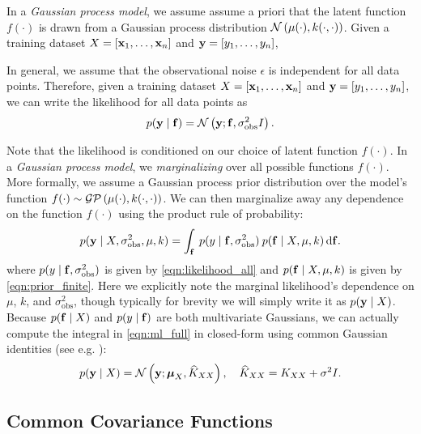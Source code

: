 In a \emph{Gaussian process model}, we assume assume a priori that the latent function $f(\cdot)$ is drawn from a Gaussian process distribution $\mathcal{N} \left( \mu(\cdot), k(\cdot, \cdot) \right)$.
Given a training dataset $X = [\mathbf{x}_1, \ldots, \mathbf{x}_n]$ and $\mathbf{y} = [y_1, \ldots, y_n]$,


In general, we assume that the observational noise $\epsilon$ is independent for all data points.
Therefore, given a training dataset $X = [\mathbf{x}_1, \ldots, \mathbf{x}_n]$ and $\mathbf{y} = [y_1, \ldots, y_n]$, we can write the likelihood for all data points as
%
\begin{equation}
  p(\mathbf{y} \mid \mathbf{f}) = \mathcal{N} \left(  \mathbf{y}; \mathbf{f}, \sigma^2_\text{obs} I \right).
  \label{eqn:likelihood_all}
\end{equation}

Note that the likelihood is conditioned on our choice of latent function $f(\cdot)$.
In a \emph{Gaussian process model}, we \emph{marginalizing} over all possible functions $f(\cdot)$.
More formally, we assume a Gaussian process prior distribution over the model's function $f(\cdot) \sim \mathcal{GP} \left( \mu(\cdot), k(\cdot, \cdot) \right)$.
We can then marginalize away any dependence on the function $f(\cdot)$ using the product rule of probability:
%
\begin{equation}
  p( \mathbf{y} \mid X, \sigma^2_\text{obs}, \mu, k ) = \int_{\mathbf{f}} \: p( y \mid \mathbf{f}, \sigma^2_\text{obs} ) \: p( \mathbf{f} \mid X, \mu, k ) \,\mathrm{d}{\mathbf{f}}.
  \label{eqn:ml_full}
\end{equation}
%
where $p( y \mid \mathbf{f}, \sigma^2_\text{obs})$ is given by \autoref{eqn:likelihood_all} and $p( \mathbf{f} \mid X, \mu, k )$ is given by \autoref{eqn:prior_finite}.
Here we explicitly note the marginal likelihood's dependence on $\mu$, $k$, and $\sigma^2_\text{obs}$, though typically for brevity we will simply write it as $p(\mathbf{y} \mid X)$.
Because $p( \mathbf{f} \mid X)$ and $p( y \mid \mathbf{f})$ are both multivariate Gaussians, we can actually compute the integral in \autoref{eqn:ml_full} in closed-form using common Gaussian identities (see e.g. \cite{bishop2006pattern,rasmussen2006gaussian}):
%
\begin{equation}
  p( \mathbf{y} \mid X) = \mathcal{N} \left(  \mathbf{y}; \boldsymbol{\mu}_{X}, \widehat{K}_{XX} \right), \quad
  \widehat{K}_{XX} = K_{XX} + \sigma^2 I.
  \label{eqn:ml_exact}
\end{equation}

\subsection{Common Covariance Functions}
\label{sec:common_kernels}


